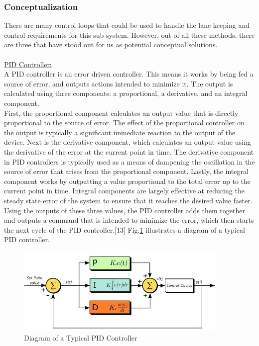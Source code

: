 \documentclass[titlepage]{article}
\begin{document}
{\subsubsection{Conceptualization}

There are many control loops that could be used to handle the lane keeping and control requirements for this sub-system. However, out of all these methods, there are three that have stood out for us as potential conceptual solutions.\\~\\
\underline{PID Controller:}\\
\indent A PID controller is an error driven controller. This means it works by being fed a source of error, and outputs actions intended to minimize it. The output is calculated using three components: a proportional, a derivative, and an integral component. \\
\indent First, the proportional component calculates an output value that is directly proportional to the source of error. The effect of the proportional controller on the output is typically a significant immediate reaction to the output of the device. Next is the derivative component, which calculates an output value using the derivative of the error at the current point in time. The derivative component in PID controllers is typically used as a means of dampening the oscillation in the source of error that arises from the proportional component. Lastly, the integral component works by outputting a value proportional to the total error up to the current point in time. Integral components are largely effective at reducing the steady state error of the system to ensure that it reaches the desired value faster.  Using the outputs of these three values, the PID controller adds them together and outputs a command that is intended to minimize the error, which then starts the next cycle of the PID controller.[13] Fig.\ref{fig:piddiagram} illustrates a diagram of a typical PID controller.\\

\begin{figure}
	\centering
	\includegraphics[width=4in]{PID2.jpg}
	\caption{Diagram of a Typical PID Controller}
	\label{fig:piddiagram}
\end{figure}


}
\end{document}
